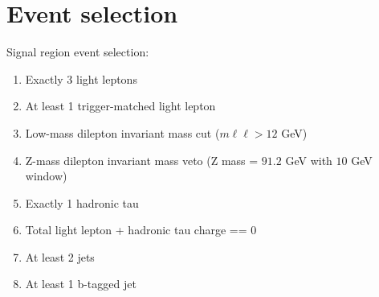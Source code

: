 \documentclass[11pt]{article}
\begin{document}
	\clearpage
	\section{Event selection} 
		Signal region event selection:
		\begin{enumerate}
			\item Exactly 3 light leptons
			\item At least 1 trigger-matched light lepton 
			\item Low-mass dilepton invariant mass cut ($m\ell\ell>12$ GeV) 
			\item Z-mass dilepton invariant mass veto (Z mass = $91.2$ GeV with $10$ GeV window) 
			\item Exactly 1 hadronic tau 
			\item Total light lepton + hadronic tau charge == 0 
			\item At least 2 jets
			\item At least 1 b-tagged jet
		\end{enumerate} 

	

	
	
\end{document}
